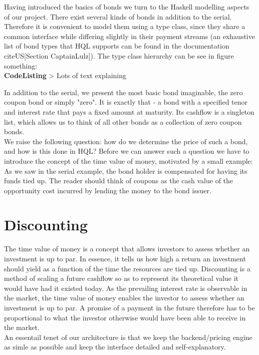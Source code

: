 Having introduced the basics of bonds we turn to the Haskell modelling aspects 
of our project. There exist several kinds of bonds in addition to the serial. 
Therefore it is convenient to model them using a type class, since they share a 
common interface while differing slightly in their payment streams (an 
exhaustive list of bond types that HQL supports can be found in the 
documentation cite{US}[Section CaptainLulz]). The type class hierarchy can be 
see in figure something:\\

\textbf{CodeListing}
> Lots of text explaining


In addition to the serial, we present the most basic bond imaginable, the zero 
coupon bond or simply "zero". It is exactly that - a bond with a specified 
tenor and interest rate that pays a fixed amount at maturity. Its cashflow is a 
singleton list, which allows us to think of all other bonds as a collection of 
zero coupon bonds.\\

We raise the following question: how do we determine the price of such a bond, 
and how is this done in HQL? Before we can answer such a question we have to 
introduce the concept of the time value of money, motivated by a small example: 
As we saw in the serial example, the bond holder is compensated for having its 
funds tied up. The reader should think of coupons as the cash value of the 
opportunity cost incurred by lending the money to the bond issuer.

\section{Discounting}

The time value of money is a concept that allows investors to assess whether an 
investment is up to par. In essence, it tells us how high a return an 
investment should yield as a function of the time the resources are tied up. 
Discounting is a method of scaling a future cashflow so as to represent its 
theoretical value it would have had it existed today. As the prevailing 
interest rate is observable in the market, the time value of money enables the 
investor to assess whether an investment is up to par. A promise of a payment 
in the future therefore has to be proportional to what the investor otherwise 
would have been able to receive in the market.\\

An essentail tenet of our architecture is that we keep the backend/pricing 
engine as simle as possible and keep the interface detailed and 
self-explanatory.\\

